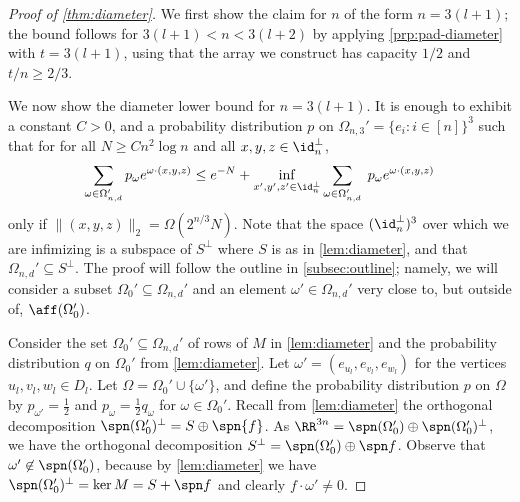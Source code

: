 \begin{proof}[Proof of \cref{thm:diameter}] We first show the claim for $n$ of the form $n = 3(l + 1)$; the bound follows for $3(l+1) < n < 3(l + 2)$ by applying \cref{prp:pad-diameter} with $t = 3(l +1)$, using that the array we construct has capacity $1/2$ and $t/n \geq 2/3$. 

We now show the diameter lower bound for $n = 3(l+1)$. It is enough to exhibit a constant $C>0$, and a probability distribution $p$ on $\Omega_{n,3}' = \{e_i: i \in [n]\}^3$ such that for for all $N \geq C n^2 \log n$ and all $x, y, z \in \id_n^\perp$, 
 $$\sum_{\omega \in \Omega_{n,d}'} p_\omega e^{\omega \cdot (x,y,z)} \leq  e^{-N} + \inf_{x', y', z' \in \id_n^\perp} \sum_{\omega \in \Omega_{n,d}'}\; p_\omega e^{\omega \cdot (x,y,z)}$$
 only if $\|(x,y,z)\|_2 = \Omega( 2^{n/3} N)$. Note that the space $(\id_n^\perp)^3$ over which we are infimizing is a subspace of $S^\perp$ where $S$ is as in \cref{lem:diameter}, and that $\Omega_{n,d}' \subseteq S^\perp$. The proof will follow the outline in \cref{subsec:outline}; namely, we will consider a subset $\Omega_0' \subseteq \Omega_{n,d}'$ and an element $\omega' \in \Omega_{n,d}'$ very close to, but outside of, $\aff(\Omega_0')$.

Consider the set $\Omega_0' \subseteq \Omega_{n,d}'$ of rows of $M$ in \cref{lem:diameter} and the probability distribution $q$ on $\Omega_0'$ from \cref{lem:diameter}. Let $\omega' = (e_{u_l}, e_{v_l}, e_{w_l})$ for the vertices $u_l, v_l, w_l \in D_l$.
Let $\Omega = \Omega_0' \cup \{\omega'\}$, and define the probability distribution $p$ on $\Omega$ by $p_{\omega'} = \frac{1}{2}$ and $p_{\omega} = \frac{1}{2} q_{\omega}$ for $\omega \in \Omega_0'$. Recall from \cref{lem:diameter} the orthogonal decomposition $\spn(\Omega_0')^\perp = S \oplus \spn{f}$. As $\RR^{3n} = \spn(\Omega_0') \oplus \spn(\Omega_0')^\perp$, we have the orthogonal decomposition $S^\perp = \spn(\Omega_0') \oplus \spn f$. Observe that $\omega' \not\in \spn(\Omega_0')$, because by \cref{lem:diameter} we have $\spn (\Omega_0')^\perp = \ker M =  S + \spn f$ and clearly $f \cdot \omega' \neq 0$.


\end{proof}
